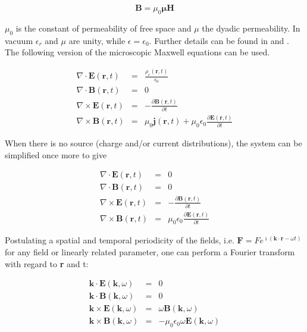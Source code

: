 \documentclass[a4paper,11pt]{thesis}
\begin{document}
\begin{equation}
\mathbf{B} = \mu_0 \mathbf{\mu} \mathbf{H} \label{constitutive_2_vacuum}
\end{equation}

$\mu_0$ is the constant of permeability of free space and $\mu$ the dyadic permeability. In vacuum $\epsilon_r$ and $\mu$ are unity, while
$\epsilon=\epsilon_0$. Further details can be found in \cite{ginzburg} and \cite{stix}. The following version of the microscopic Maxwell equations can be
used.

\begin{eqnarray}
\nabla \cdot \mathbf{E}(\mathbf{r},t)&=&\frac{\rho_c(\mathbf{r},t)}{\epsilon_0} \label{vac_maxwell1}\\
\nabla \cdot \mathbf{B}(\mathbf{r},t)&=&0 \label{vac_maxwell2} \\
\nabla \times \mathbf{E}(\mathbf{r},t)&=&-\frac{\partial \mathbf{B}(\mathbf{r},t)}{\partial t} \label{vac_maxwell3} \\
\nabla \times \mathbf{B}(\mathbf{r},t)&=&\mu_0
\mathbf{j}(\mathbf{r},t)+ \mu_0 \epsilon_0 \frac{\partial
\mathbf{E}(\mathbf{r},t)}{\partial t} \label{vac_maxwell4}
\end{eqnarray}


When there is no source (charge and/or current distributions), the system can be simplified once more to
give

\begin{eqnarray}
\nabla \cdot \mathbf{E}(\mathbf{r},t)&=&0 \label{free_maxwell1}\\
\nabla \cdot \mathbf{B}(\mathbf{r},t)&=&0 \label{free_maxwell2} \\
\nabla \times \mathbf{E}(\mathbf{r},t)&=&-\frac{\partial
\mathbf{B}(\mathbf{r},t)}{\partial t} \label{free_maxwell3} \\
\nabla \times \mathbf{B}(\mathbf{r},t)&=& \mu_0 \epsilon_0
\frac{\partial \mathbf{E}(\mathbf{r},t)}{\partial t}
\label{free_maxwell4}
\end{eqnarray}

Postulating a spatial and temporal periodicity of the fields, i.e. $\mathbf{F}=F e^{\imath (\mathbf{k}\cdot \mathbf{r}-\omega t)}$ for any field or linearly related parameter, one
can perform a Fourier transform with regard to \textbf{r} and t:

\begin{eqnarray}
 \mathbf{k} \cdot \mathbf{E}(\mathbf{k},\omega)&=&0 \label{FT_maxwell1}\\
 \mathbf{k} \cdot \mathbf{B}(\mathbf{k},\omega)&=&0 \label{FT_maxwell2} \\
 \mathbf{k} \times \mathbf{E}(\mathbf{k},\omega)&=& \omega  \mathbf{B}(\mathbf{k},\omega) \label{FT_maxwell3}
 \\
 \mathbf{k}  \times \mathbf{B}(\mathbf{k},\omega)&=& - \mu_0 \epsilon_0  \omega  \mathbf{E}(\mathbf{k},\omega)
 \label{FT_maxwell4}
\end{eqnarray}\\
\end{document}
